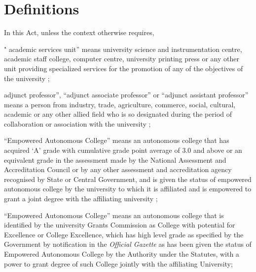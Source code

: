 \documentclass[default]{mhact}
\begin{document}
      \section{Definitions}
      
In this Act, unless the context otherwise requires,


      \begin{subsectionlist}
    

" academic services unit'' means university science and instrumentation centre, academic staff college, computer centre, university printing press or any other unit providing specialized services for the promotion of any of the objectives of the university ;


adjunct professor'', ``adjunct associate professor'' or ``adjunct assistant professor'' means a person from industry, trade, agriculture, commerce, social, cultural, academic or any other allied field who is so designated during the period of collaboration or association with the university ;


``Empowered Autonomous College'' means an autonomous college that has acquired `A' grade with cumulative grade point average of 3.0 and above or an equivalent grade in the assessment made by the National Assessment and Accreditation Council or by any other assessment and accreditation agency recognised by State or Central Government, and is given the status of empowered autonomous college by the university to which it is affiliated and is empowered to grant a joint degree with the affiliating university ;


``Empowered Autonomous College'' means an autonomous college that is identified by the university Grants Commission as College with potential for Excellence or College Excellence, which has high level grade as specified by the Government by notification in the \emph{Official Gazette} as has been given the status of Empowered Autonomous College by the Authority under the Statutes, with a power to grant degree of such College jointly with the affiliating University;





\end{subsectionlist}
\end{document}
